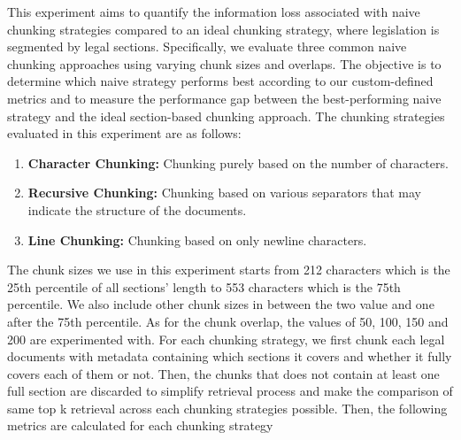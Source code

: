 This experiment aims to quantify the information loss associated with naive chunking strategies compared to an ideal chunking strategy, where legislation is segmented by legal sections. Specifically, we evaluate three common naive chunking approaches using varying chunk sizes and overlaps. The objective is to determine which naive strategy performs best according to our custom-defined metrics and to measure the performance gap between the best-performing naive strategy and the ideal section-based chunking approach. The chunking strategies evaluated in this experiment are as follows:
\begin{enumerate}
    \item \textbf{Character Chunking: }Chunking purely based on the number of characters.
    \item \textbf{Recursive Chunking: }Chunking based on various separators that may indicate the structure of the documents.
    \item \textbf{Line Chunking: }Chunking based on only newline characters.
\end{enumerate}
The chunk sizes we use in this experiment starts from 212 characters which is the 25th percentile of all sections' length to 553 characters which is the 75th percentile. We also include other chunk sizes in between the two value and one after the 75th percentile. As for the chunk overlap, the values of 50, 100, 150 and 200 are experimented with. For each chunking strategy, we first chunk each legal documents with metadata containing which sections it covers and whether it fully covers each of them or not. Then, the chunks that does not contain at least one full section are discarded to simplify retrieval process and make the comparison of same top k retrieval across each chunking strategies possible. Then, the following metrics are calculated for each chunking strategy
